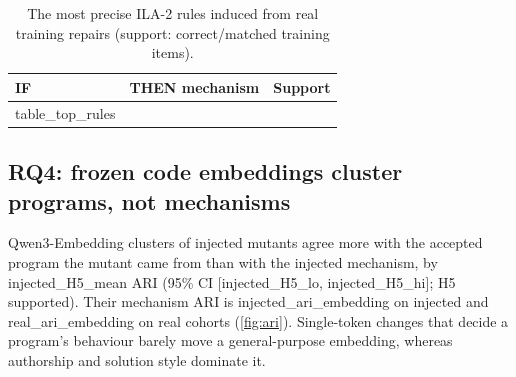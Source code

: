 \begin{table}[t]
\centering
\caption{The most precise ILA-2 rules induced from real training repairs (support: correct/matched training items).}\label{tab:toprules}
\small
\begin{tabular}{p{7.6cm}p{3.0cm}r}
\toprule
IF & THEN mechanism & Support \\
\midrule
{{table_top_rules}}
\bottomrule
\end{tabular}
\end{table}

\subsection{RQ4: frozen code embeddings cluster programs, not mechanisms}
Qwen3-Embedding clusters of injected mutants agree more with the accepted program the mutant came from than with the injected mechanism, by {{injected_H5_mean}} ARI (95\% CI [{{injected_H5_lo}}, {{injected_H5_hi}}]; H5 supported). Their mechanism ARI is {{injected_ari_embedding}} on injected and {{real_ari_embedding}} on real cohorts (\cref{fig:ari}). Single-token changes that decide a program's behaviour barely move a general-purpose embedding, whereas authorship and solution style dominate it.
